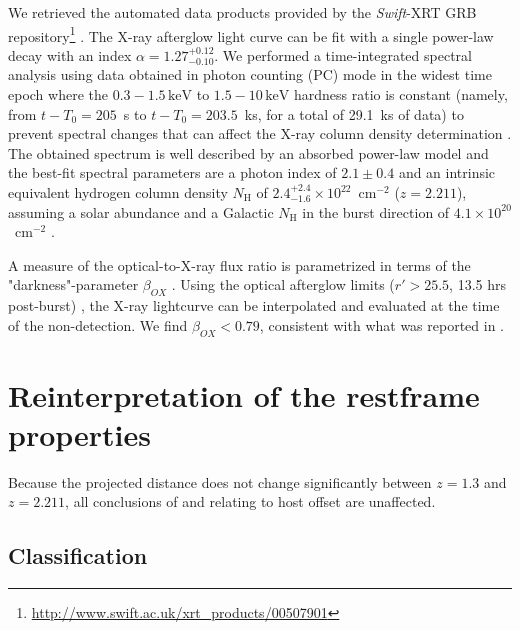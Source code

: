 \documentclass{aa}    %
\begin{document}
We retrieved the automated data products provided by the \textit{Swift}-XRT GRB
repository\footnote{\url{http://www.swift.ac.uk/xrt\_products/00507901}}
\citep{Evans2009}. 
The X-ray afterglow light curve can be fit with a single power-law decay with an
index $\alpha=1.27_{-0.10}^{+0.12}$. We performed a time-integrated spectral
analysis using data obtained in photon counting (PC) mode in the widest time epoch where
the $0.3-1.5\,\mathrm{keV}$ to $1.5-10\,\mathrm{keV}$ hardness ratio is constant
(namely, from $t-T_0 = 205$~s to $t-T_0 = 203.5$~ks, for a total of 29.1~ks of
data) to prevent spectral changes that can affect the X-ray column density
determination \citep{Kopac2012}. 
The obtained spectrum is well described by an absorbed power-law
model and the best-fit spectral parameters are a photon index of $2.1 \pm 0.4$ and
an intrinsic equivalent hydrogen column density $N_{\mathrm{H}}$ of $2.4_{-1.6}^{+2.4}
\times 10^{22}$~cm$^{-2}$ ($z=2.211$), assuming a solar abundance and a Galactic $N_{\mathrm{H}}$ in
the burst direction of $4.1 \times 10^{20}$~cm$^{-2}$ \citep{Willingale2013}.

A measure of the optical-to-X-ray flux ratio is parametrized in terms of the
"darkness"-parameter $\beta_{OX} $ \citep{Jakobsson2004}. Using the optical
afterglow limits ($r' > 25.5$, 13.5 hrs post-burst) \citep{Cucchiara2011,
	Cenko2011}, the X-ray lightcurve can be interpolated and evaluated at the time
of the non-detection. We find $\beta_{OX} < 0.79$, consistent with what was
reported in \citet{Sakamoto2013}.

\section{Reinterpretation of the restframe properties}

Because the projected distance does not change significantly between $z = 1.3$ and $z =
2.211$, all conclusions of \citet{Margutti2012} and \citet{Sakamoto2013}
relating to host offset are unaffected.

\subsection{Classification} \label{classification}
\end{document}
